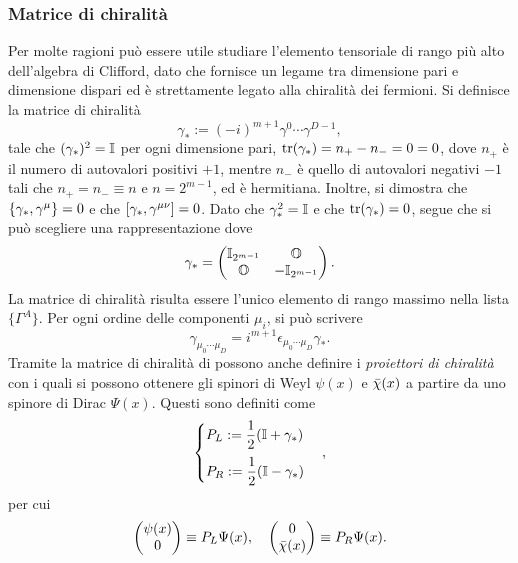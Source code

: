 \subsubsection{Matrice di chiralità}
Per molte ragioni può essere utile studiare l'elemento tensoriale di rango più alto dell'algebra di Clifford, dato che fornisce un legame tra dimensione pari e dimensione dispari ed è strettamente legato alla chiralità dei fermioni. Si definisce la matrice di chiralità
\begin{equation}
\label{eq: matrice di chiralità}
    \gamma_* := (-i)^{m + 1}\gamma^0\cdots \gamma^{D - 1},
\end{equation}
tale che $(\gamma_*)^2 = \mathbb{I}$ per ogni dimensione pari, $\mathrm{tr}{(\gamma_*)} = n_+ - n_- = 0 = 0$, dove $n_+$ è il numero di autovalori positivi $+1$, mentre $n_-$ è quello di autovalori negativi $-1$ tali che $n_+ = n_- \equiv n$ e $n = 2^{m - 1}$, ed è hermitiana. Inoltre, si dimostra che $\{\gamma_*,\gamma^\mu\} = 0$ e che $[\gamma_*,\gamma^{\mu\nu}] = 0$. Dato che $\gamma_*^2 = \mathbb{I}$ e che $\mathrm{tr}{(\gamma_*)} = 0$, segue che si può scegliere una rappresentazione dove 
\begin{equation}
    \gamma_* = 
    \begin{pmatrix}
        \mathbb{I}_{2^{m - 1}} & \mathbb{O} \\
        \mathbb{O} & -\mathbb{I}_{2^{m - 1}}
    \end{pmatrix}.
\end{equation}
La matrice di chiralità risulta essere l'unico elemento di rango massimo nella lista $\{\Gamma^A\}$. Per ogni ordine delle componenti $\mu_i$, si può scrivere 
\begin{equation}
    \gamma_{\mu_0\cdots\mu_D} = i^{m + 1}\epsilon_{\mu_0\cdots\mu_D}\gamma_*.
\end{equation}
Tramite la matrice di chiralità di possono anche definire i \emph{proiettori di chiralità} con i quali si possono ottenere gli spinori di Weyl $\psi(x)$ e $\bar{\chi}(x)$ a partire da uno spinore di Dirac $\Psi(x)$. Questi sono definiti come 
\begin{equation}
\label{eq: proiettori di chiralità}
    \begin{cases}
        P_L := \dfrac{1}{2}(\mathbb{I} + \gamma_*) \\[2ex]
        P_R := \dfrac{1}{2}(\mathbb{I} - \gamma_*)
    \end{cases},
\end{equation}
per cui 
\begin{equation}
    \begin{pmatrix}
        \psi(x) \\
        0
    \end{pmatrix}
    \equiv P_L\Psi(x),\quad 
    \begin{pmatrix}
        0 \\
        \bar{\chi}(x)
    \end{pmatrix} 
    \equiv P_R\Psi(x).
\end{equation}
